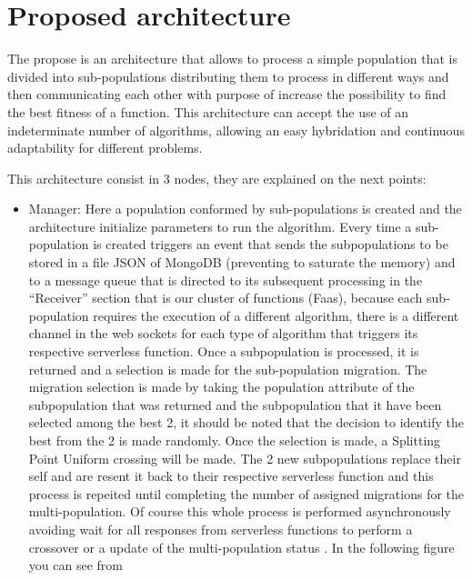 \documentclass[runningheads]{llncs}
\begin{document}
\section{Proposed architecture}

The propose is an architecture that allows to process a simple population that
is divided into sub-populations distributing them to process in different ways
and then communicating each other with purpose of increase the possibility to
find the best fitness of a function. This architecture can accept the use of an
indeterminate number of algorithms, allowing an easy hybridation and continuous
adaptability for different problems.

This architecture consist in 3 nodes, they are explained on the next points:

\begin{itemize}
  \item Manager: 
  Here a population conformed by sub-populations is created and the architecture
  initialize parameters to run the algorithm. Every time a sub-population is created 
  triggers an event that sends the subpopulations to be stored in a file JSON of
  MongoDB (preventing to saturate the memory) and to a message queue that is
  directed to its subsequent processing in the “Receiver” section that is our
  cluster of functions (Faas), because each sub-population requires the execution
  of a different algorithm, there is a different channel in the web sockets for
  each type of algorithm that triggers its respective serverless function. Once
  a subpopulation is processed, it is returned and a selection is made for the
  sub-population migration. The migration selection is made by taking the
  population attribute of the subpopulation that was returned and the
  subpopulation that it have been selected among the best 2, it should be noted
  that the decision to identify the best from the 2 is made randomly. Once the
  selection is made, a Splitting Point Uniform crossing will be made. The 2 new
  subpopulations replace their self and are resent it back to their respective
  serverless function and this process is repeited until completing the number
  of assigned migrations for the multi-population. Of course this whole process
  is performed asynchronously avoiding wait for all responses from serverless
  functions to perform a crossover or a update of the multi-population status
  \cite{Lovbjerg2001,Jimeno2019}. In the following figure you can see from

\end{itemize}
\end{document}
